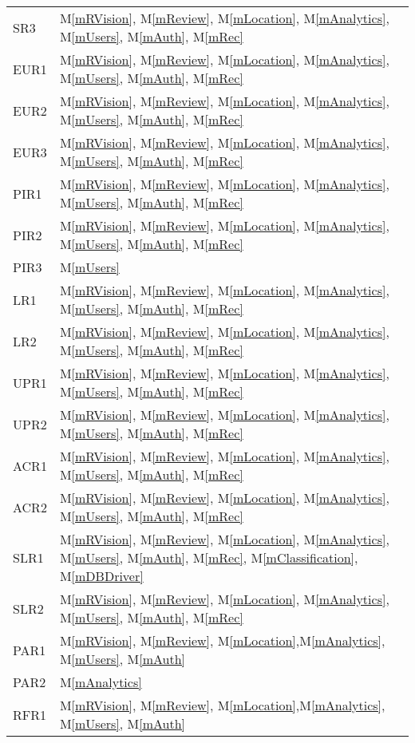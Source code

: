 \documentclass[12pt, titlepage]{article}
\newcommand{\mref}[1]{M\ref{#1}}
\begin{document}
\begin{longtable}{p{} p{}}
SR3 & \mref{mRVision}, \mref{mReview}, \mref{mLocation}, \mref{mAnalytics}, \mref{mUsers}, \mref{mAuth}, \mref{mRec}\\
EUR1 & \mref{mRVision}, \mref{mReview}, \mref{mLocation}, \mref{mAnalytics}, \mref{mUsers}, \mref{mAuth}, \mref{mRec}\\
EUR2 & \mref{mRVision}, \mref{mReview}, \mref{mLocation}, \mref{mAnalytics}, \mref{mUsers}, \mref{mAuth}, \mref{mRec}\\
EUR3 & \mref{mRVision}, \mref{mReview}, \mref{mLocation}, \mref{mAnalytics}, \mref{mUsers}, \mref{mAuth}, \mref{mRec}\\
PIR1 & \mref{mRVision}, \mref{mReview}, \mref{mLocation}, \mref{mAnalytics}, \mref{mUsers}, \mref{mAuth}, \mref{mRec}\\
PIR2 & \mref{mRVision}, \mref{mReview}, \mref{mLocation}, \mref{mAnalytics}, \mref{mUsers}, \mref{mAuth}, \mref{mRec}\\
PIR3 & \mref{mUsers}\\
LR1 & \mref{mRVision}, \mref{mReview}, \mref{mLocation}, \mref{mAnalytics}, \mref{mUsers}, \mref{mAuth}, \mref{mRec}\\
LR2 & \mref{mRVision}, \mref{mReview}, \mref{mLocation}, \mref{mAnalytics}, \mref{mUsers}, \mref{mAuth}, \mref{mRec}\\
UPR1 & \mref{mRVision}, \mref{mReview}, \mref{mLocation}, \mref{mAnalytics}, \mref{mUsers}, \mref{mAuth}, \mref{mRec}\\
UPR2 & \mref{mRVision}, \mref{mReview}, \mref{mLocation}, \mref{mAnalytics}, \mref{mUsers}, \mref{mAuth}, \mref{mRec}\\
ACR1 & \mref{mRVision}, \mref{mReview}, \mref{mLocation}, \mref{mAnalytics}, \mref{mUsers}, \mref{mAuth}, \mref{mRec}\\
ACR2 & \mref{mRVision}, \mref{mReview}, \mref{mLocation}, \mref{mAnalytics}, \mref{mUsers}, \mref{mAuth}, \mref{mRec}\\
SLR1 & \mref{mRVision}, \mref{mReview}, \mref{mLocation}, \mref{mAnalytics}, \mref{mUsers}, \mref{mAuth}, \mref{mRec}, \mref{mClassification}, \mref{mDBDriver}\\
SLR2 & \mref{mRVision}, \mref{mReview}, \mref{mLocation}, \mref{mAnalytics}, \mref{mUsers}, \mref{mAuth}, \mref{mRec}\\
PAR1 & \mref{mRVision}, \mref{mReview}, \mref{mLocation},\mref{mAnalytics}, \mref{mUsers}, \mref{mAuth}\\
PAR2 & \mref{mAnalytics}\\
RFR1 & \mref{mRVision}, \mref{mReview}, \mref{mLocation},\mref{mAnalytics}, \mref{mUsers}, \mref{mAuth}\\

\end{longtable}
\end{document}
